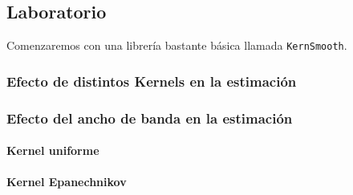 \documentclass[12pt]{book}\usepackage[]{graphicx}\usepackage[]{color}
\theoremstyle{definition}
\theoremstyle{plain}
\begin{document}
\subsection{Laboratorio}

Comenzaremos con una librería bastante básica llamada \texttt{KernSmooth}.

\subsubsection{ Efecto de distintos Kernels en la estimación }









 \subsubsection{Efecto del ancho de banda en la estimación }

 \paragraph{Kernel uniforme}


 \paragraph{Kernel Epanechnikov}





\end{document}
